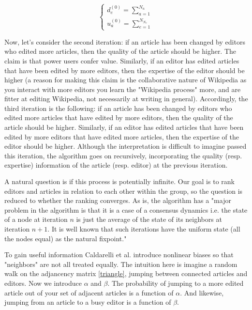 \begin{equation}
\begin{cases}
 d_{e}^{(0)} = \sum_{a=1}^{N_{a}}\\
 u_{a}^{(0)} = \sum_{e=1}^{N_{N_{e}}}
\end{cases}
\end{equation}

Now, let's consider the second iteration:  if an article has been changed by editors who edited more articles, then the quality of the article should be higher. The claim is that power users confer value. Similarly, if an editor has edited articles that have been edited by more editors, then the expertise of the editor should be higher (a reason for making this claim is the collaborative nature of Wikipedia as you interact with more editors you learn the "Wikipedia process" more, and are fitter at editing Wikipedia, not necessarily at writing in general). Accordingly, the third iteration is the following: if an article has been changed by editors who edited more articles that have edited by more editors, then the quality of the article should be higher. Similarly, if an editor has edited articles that have been edited by more editors that have edited more articles, then the expertise of the editor should be higher. Although the interpretation is difficult to imagine passed this iteration, the algorithm goes on recursively, incorporating the quality (resp. expertise) information of the article (resp. editor) at the previous iteration.

A natural question is if this process is potentially infinite. Our goal is to rank editors and articles in relation to each other within the group, so the question is reduced to whether the ranking converges. As is, the algorithm
has a "major problem in the algorithm is that it is a case of a
consensus dynamics i.e. the state of a node at iteration $n$ is just
the average of the state of its neighbors at iteration $n+1$. It is well
known that such iterations have the uniform state (all the nodes
equal) as the natural fixpoint." \cite{caldarelli2012network}

To gain useful information Caldarelli et al. introduce nonlinear biases so that "neighbors" are not all treated equally. The intuition here is imagine a random walk on the adjancency matrix \ref{triangle}, jumping between connected articles and editors. Now we introduce $\alpha$ and $\beta$. The probability of jumping to a more edited article out of your set of adjacent articles is a function of $\alpha$. And likewise, jumping from an article to a busy editor is a function of $\beta$.

